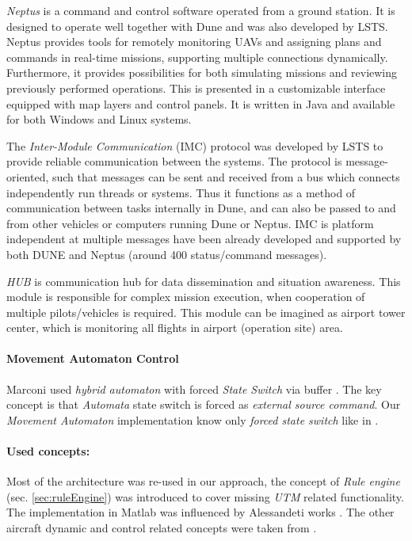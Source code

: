 \textit{Neptus} \cite{pinto2006neptus,dias2006mission,dias2005neptus} is a command and control software operated from a ground station. It is designed to operate well together with Dune and was also developed by LSTS. Neptus provides tools for remotely monitoring UAVs and assigning plans and commands in real-time missions, supporting multiple connections dynamically. Furthermore, it provides possibilities for both simulating missions and reviewing previously performed operations. This is presented in a customizable interface equipped with map layers and control panels. It is written in Java and available for both Windows and Linux systems.

The \textit{Inter-Module Communication} \cite{martins2009imc} (IMC) protocol was developed by LSTS to provide reliable communication between the systems.  The protocol is message-oriented, such that messages can be sent and received from a bus which connects independently run threads or systems.  Thus it functions as a method of communication between tasks internally in Dune, and can also be passed to and from other vehicles or computers running Dune or Neptus.  IMC is platform independent at multiple messages have been already developed and supported by both DUNE and Neptus (around 400 status/command messages).

\textit{HUB} is communication hub for data dissemination and situation awareness. This module is responsible for complex mission execution, when cooperation of multiple pilots/vehicles is required. This module can be imagined as airport tower center, which is monitoring all flights in airport (operation site) area.

\paragraph{Movement Automaton Control} Marconi used \emph{hybrid automaton} with forced \emph{State Switch} via buffer \cite{marconi2009control}. The key concept is that \emph{Automata} state switch is forced as \emph{external source command}. Our \emph{Movement Automaton} implementation know only \emph{forced state switch} like in \cite{frazzoli2000trajectory}. 

\paragraph{Used concepts:} Most of the architecture was re-used in our approach, the concept of \emph{Rule engine} (sec. \ref{sec:ruleEngine}) was introduced to cover missing \emph{UTM} related functionality. The implementation in Matlab was influenced by Alessandeti works \cite{allesandeti2016virtualArena,alessandrettinotes}. The other aircraft dynamic and control related concepts were taken from  \cite{stevens2015aircraft}.

